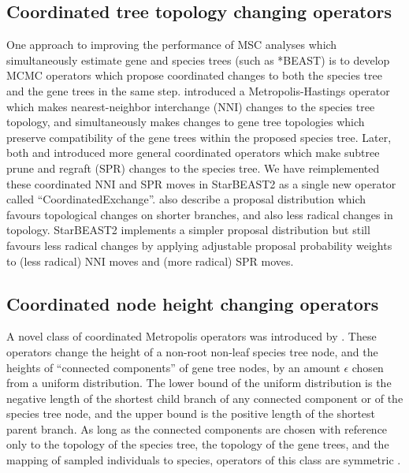 \documentclass[nogrid]{MBE}%
\begin{document}
\subsection{Coordinated tree topology changing operators}

One approach to improving the performance of MSC analyses which simultaneously
estimate gene and species trees (such as *BEAST) is to develop MCMC operators
which propose coordinated changes to both the species tree and the gene trees in
the same step. \cite{Yang01122014} introduced a Metropolis-Hastings \citep[MH;][]{Metropolis1953, Hastings1970}
operator which makes nearest-neighbor interchange (NNI) changes to the species
tree topology, and simultaneously makes changes to gene tree topologies which
preserve compatibility of the gene trees within the proposed species tree.
Later, both \cite{Jones2016} and \cite{2015arXiv151203843R} introduced more
general coordinated operators which make subtree prune and regraft (SPR) changes
to the species tree. We have reimplemented these coordinated NNI and SPR moves
in StarBEAST2 as a single new operator called ``CoordinatedExchange''.
\cite{2015arXiv151203843R} also describe a proposal distribution which favours
topological changes on shorter branches, and also less radical changes in
topology. StarBEAST2 implements a simpler proposal distribution but still
favours less radical changes by applying adjustable proposal probability weights
to (less radical) NNI moves and (more radical) SPR moves.

\subsection{Coordinated node height changing operators}

A novel class of coordinated Metropolis operators was introduced by
\cite{Jones2016}. These operators change the height of a non-root non-leaf
species tree node, and the heights of ``connected components'' of gene tree
nodes, by an amount $\epsilon$ chosen from a uniform distribution.
The lower bound of the uniform distribution is the negative length of
the shortest child branch of any connected component or of the species tree node,
and the upper bound is the positive length of the shortest parent branch. As
long as the connected components are chosen with reference only to the topology
of the species tree, the topology of the gene trees, and the mapping of
sampled individuals to species, operators of this class are symmetric
\citep{Jones2016}.
\end{document}
